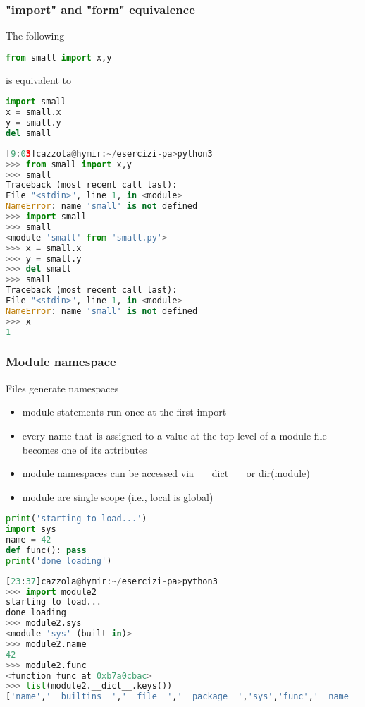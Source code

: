 \subsubsection{"import" and "form" equivalence}

The following
\begin{lstlisting}[language=Python]
from small import x,y
\end{lstlisting}

is equivalent to
\begin{lstlisting}[language=Python]
import small
x = small.x
y = small.y
del small
\end{lstlisting}

\begin{lstlisting}[language=Python]
[9:03]cazzola@hymir:~/esercizi-pa>python3
>>> from small import x,y
>>> small
Traceback (most recent call last):
File "<stdin>", line 1, in <module>
NameError: name 'small' is not defined
>>> import small
>>> small
<module 'small' from 'small.py'>
>>> x = small.x
>>> y = small.y
>>> del small
>>> small
Traceback (most recent call last):
File "<stdin>", line 1, in <module>
NameError: name 'small' is not defined
>>> x
1
\end{lstlisting}

\subsubsection{Module namespace}
Files generate namespaces

\begin{itemize}
   \item module statements run once at the first import
   \item every name that is assigned to a value at the top level of a module file becomes one of its attributes
   \item module namespaces can be accessed via \_\_dict\_\_ or dir(module)
   \item  module are single scope (i.e., local is global)
\end{itemize}


\begin{lstlisting}[language=Python]
print('starting to load...')
import sys
name = 42
def func(): pass
print('done loading')
\end{lstlisting}

\begin{lstlisting}[language=Python]
[23:37]cazzola@hymir:~/esercizi-pa>python3
>>> import module2
starting to load...
done loading
>>> module2.sys
<module 'sys' (built-in)>
>>> module2.name
42
>>> module2.func
<function func at 0xb7a0cbac>
>>> list(module2.__dict__.keys())
['name','__builtins__','__file__','__package__','sys','func','__name__','__doc__']
\end{lstlisting}

